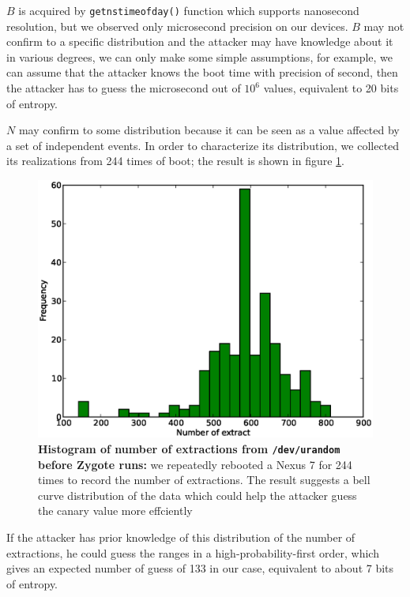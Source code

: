 $B$ is acquired by \verb|getnstimeofday()| function which supports nanosecond resolution, but we observed only microsecond precision on our devices.
$B$ may not confirm to a specific distribution and the attacker may have knowledge about it in various degrees, we can only make some simple assumptions, for example, we can assume that the attacker knows the boot time with precision of second, then the attacker has to guess the microsecond out of $10^6$ values, equivalent to 20 bits of entropy.

$N$ may confirm to some distribution because it can be seen as a value affected by a set of independent events. In order to characterize its distribution, we collected its realizations from 244 times of boot; the result is shown in figure \ref{fighist}.

\begin{figure}[t]
\begin{center}
\includegraphics[scale=0.4]{hist.eps}
\end{center}
\caption{{\bf Histogram of number of extractions from \texttt{/dev/urandom} before Zygote runs:} we repeatedly rebooted a Nexus 7 for 244 times to record the number of extractions. The result suggests a bell curve distribution of the data which could help the attacker guess the canary value more effciently }
\label{fighist}
\end{figure}

If the attacker has prior knowledge of this distribution of the number of extractions, he could guess the ranges in a high-probability-first order, which gives an expected number of guess of 133 in our case, equivalent to about 7 bits of entropy.


